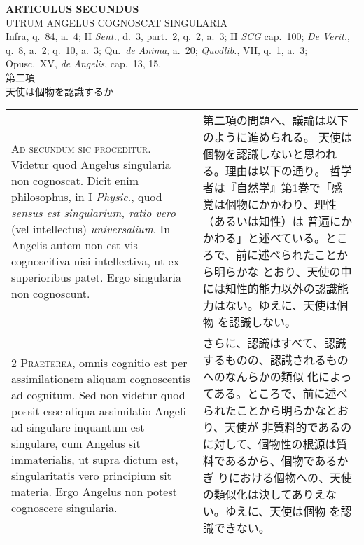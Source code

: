 \documentclass[10pt]{jsarticle} %
\begin{document}
\begin{center}
 {\Large {\bf ARTICULUS SECUNDUS}}\\
 {\large UTRUM ANGELUS COGNOSCAT SINGULARIA}\\
 {\footnotesize Infra, q.~84, a.~4; II {\itshape Sent.}, d.~3, part.~2,
 q.~2, a.~3; II {\itshape SCG} cap.~100; {\itshape De Verit.}, q.~8,
 a.~2; q.~10, a.~3; Qu.~{\itshape de Anima}, a.~20; {\itshape Quodlib.},
 VII, q.~1, a.~3; Opusc.~XV, {\itshape de Angelis}, cap.~13, 15.}\\
 {\Large 第二項\\天使は個物を認識するか}
\end{center}

\begin{longtable}{p{21em}p{21em}}


{\huge A}{\scshape d secundum sic proceditur}. Videtur quod
Angelus singularia non cognoscat. Dicit enim philosophus, in I {\itshape Physic}.,
quod {\itshape sensus est singularium, ratio vero} (vel intellectus)
{\itshape universalium}. In Angelis autem non est vis cognoscitiva nisi
intellectiva, ut ex superioribus patet. Ergo singularia non cognoscunt.


&

 第二項の問題へ、議論は以下のように進められる。
 天使は個物を認識しないと思われる。理由は以下の通り。
 哲学者は『自然学』第1巻で「感覚は個物にかかわり、理性（あるいは知性）は
 普遍にかかわる」と述べている。ところで、前に述べられたことから明らかな
 とおり、天使の中には知性的能力以外の認識能力はない。ゆえに、天使は個物
 を認識しない。
 

\\


{\scshape 2 Praeterea}, omnis cognitio est per
assimilationem aliquam cognoscentis ad cognitum. Sed non videtur quod
possit esse aliqua assimilatio Angeli ad singulare inquantum est
singulare, cum Angelus sit immaterialis, ut supra dictum est,
singularitatis vero principium sit materia. Ergo Angelus non potest
cognoscere singularia.


&

 さらに、認識はすべて、認識するものの、認識されるものへのなんらかの類似
 化によってある。ところで、前に述べられたことから明らかなとおり、天使が
 非質料的であるのに対して、個物性の根源は質料であるから、個物であるかぎ
 りにおける個物への、天使の類似化は決してありえない。ゆえに、天使は個物
 を認識できない。

\\



\end{longtable}
\end{document}
